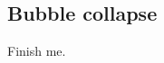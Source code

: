 \subsection{Bubble collapse}\label{sec:bubbleCollapse}

  Finish me.

\clearpage



\clearpage



\clearpage

